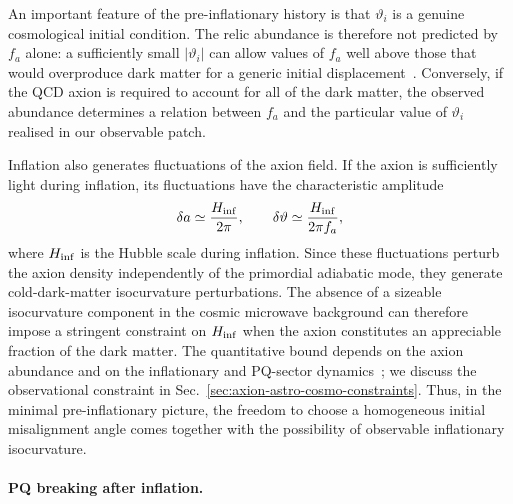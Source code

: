 \documentclass[review]{elsarticle}
\numberwithin{equation}{section}
\numberwithin{table}{section}
\numberwithin{figure}{section}
\begin{document}
An important feature of the pre-inflationary history is that $\vartheta_i$ is a genuine cosmological initial condition. The relic abundance is therefore not predicted by $f_a$ alone: a sufficiently small $|\vartheta_i|$ can allow values of $f_a$ well above those that would overproduce dark matter for a generic initial displacement~\cite{Preskill:1982cy,Abbott:1982af,Dine:1982ah,Marsh:2015xka}. Conversely, if the QCD axion is required to account for all of the dark matter, the observed abundance determines a relation between $f_a$ and the particular value of $\vartheta_i$ realised in our observable patch.

Inflation also generates fluctuations of the axion field. If the axion is sufficiently light during inflation, its fluctuations have the characteristic amplitude
\begin{align}
    \delta a
    \simeq
    \frac{H_{\rm inf}}{2\pi},
    \qquad
    \delta\vartheta
    \simeq
    \frac{H_{\rm inf}}{2\pi f_a},
    \label{eq:axion-inflationary-fluctuation}
\end{align}
where $H_{\rm inf}$ is the Hubble scale during inflation. Since these fluctuations perturb the axion density independently of the primordial adiabatic mode, they generate cold-dark-matter isocurvature perturbations. The absence of a sizeable isocurvature component in the cosmic microwave background can therefore impose a stringent constraint on $H_{\rm inf}$ when the axion constitutes an appreciable fraction of the dark matter. The quantitative bound depends on the axion abundance and on the inflationary and PQ-sector dynamics~\cite{Marsh:2015xka,OHare:2024nmr,Graham:2025iwx}; we discuss the observational constraint in Sec.~\ref{sec:axion-astro-cosmo-constraints}. Thus, in the minimal pre-inflationary picture, the freedom to choose a homogeneous initial misalignment angle comes together with the possibility of observable inflationary isocurvature.

\paragraph{PQ breaking after inflation.}
\end{document}
